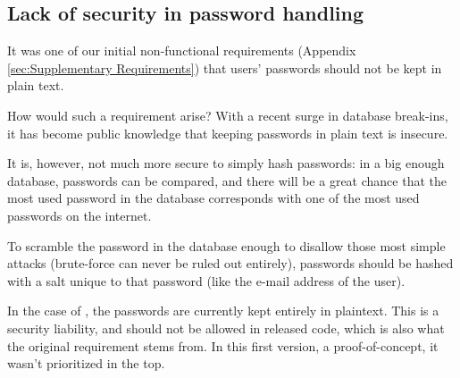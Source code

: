 \subsection{Lack of security in password handling}

It was one of our initial non-functional requirements (Appendix \ref{sec:Supplementary Requirements}) that
users' passwords should not be kept in plain text.

How would such a requirement arise? With a recent surge in database break-ins\cite{lulzsec0711}, it has
become public knowledge that keeping passwords in plain text is insecure.

It is, however, not much more secure to simply hash passwords: in a big enough database, passwords can be
compared, and there will be a great chance that the most used password in the database corresponds with one
of the most used passwords on the internet\cite{toppasswords}.

To scramble the password in the database enough to disallow those most simple attacks (brute-force can never
be ruled out entirely), passwords should be hashed with a salt unique to that password (like the e-mail address
of the user).

In the case of \SOP{}, the passwords are currently kept entirely in plaintext. This is a security liability,
and should not be allowed in released code, which is also what the original requirement stems from. In this first
version, a proof-of-concept, it wasn't prioritized in the top.
